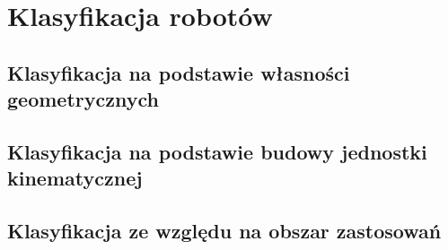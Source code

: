 \section{Klasyfikacja robotów}
\subsection{Klasyfikacja na podstawie własności geometrycznych}
\subsection{Klasyfikacja na podstawie budowy jednostki kinematycznej}
\subsection{Klasyfikacja ze względu na obszar zastosowań}